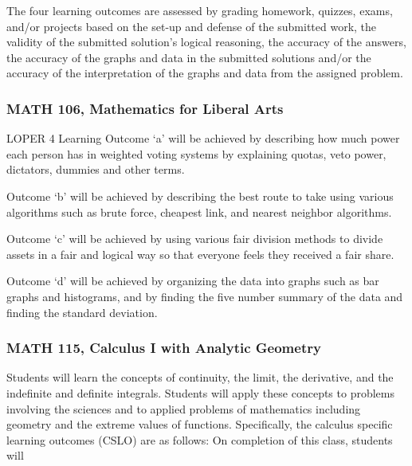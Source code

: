 \documentclass[11pt]{article}
\begin{document}
The four learning 
outcomes are assessed by grading homework, quizzes, exams, and/or 
projects based on the set-up and defense of the submitted work, 
the validity of the submitted solution's logical reasoning, the 
accuracy of the answers, the accuracy of the graphs and data in the 
submitted solutions and/or the accuracy of the interpretation of the 
graphs and data from the assigned problem. 


\subsubsection{MATH 106, Mathematics for Liberal Arts} 
LOPER 4 Learning Outcome `a' will be achieved by describing how 
much power each person has in weighted voting systems by explaining 
quotas, veto power, dictators, dummies and other terms. 

Outcome `b' will be achieved by describing the best route to take 
using various algorithms such as brute force, cheapest link, and 
nearest neighbor algorithms. 

Outcome `c' will be achieved by using various fair division methods 
to divide assets in a fair and logical way so that everyone feels 
they received a fair share. 

Outcome `d' will be achieved by organizing the data into graphs such 
as bar graphs and histograms, and by finding the five number summary 
of the data and finding the standard deviation. 


\subsubsection{MATH 115, Calculus I with Analytic Geometry} 

Students will learn the concepts of continuity, 
the limit, the derivative, and the indefinite and definite integrals. 
Students will apply these concepts to problems involving the sciences 
and to applied problems of mathematics including geometry and the 
extreme values of functions. Specifically, the calculus specific learning outcomes 
(CSLO) are as follows: On completion of this class, students will
\end{document}
